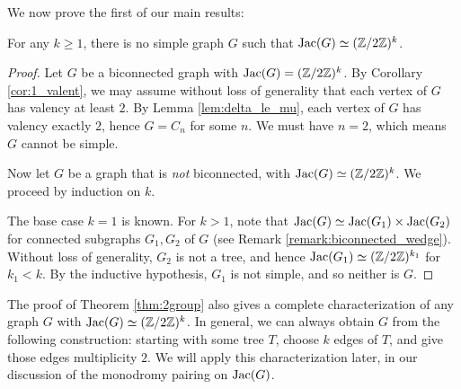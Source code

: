 \documentclass{amsart}
\begin{document}
We now prove the first of our main results:

\begin{thm}
  \label{thm:2group}
  For any $k \ge 1$, there is no simple graph $G$ such that $\operatorname{Jac}(G)
  \simeq (\mathbb{Z}/2\mathbb{Z})^k$.
\end{thm}

\begin{proof}
  Let $G$ be a biconnected graph with $\operatorname{Jac}(G) = (\mathbb{Z}/2\mathbb{Z})^k$. By
  Corollary \ref{cor:1_valent}, we may assume without loss of
  generality that each vertex of $G$ has valency at least $2$. By
  Lemma \ref{lem:delta_le_mu}, each vertex of $G$ has valency exactly
  $2$, hence $G = C_n$ for some $n$. We must have $n=2$, which means
  $G$ cannot be simple.

  Now let $G$ be a graph that is \emph{not} biconnected, with $\operatorname{Jac}(G)
  \simeq (\mathbb{Z}/2\mathbb{Z})^k$. We proceed by induction on $k$.
  
  The base case $k=1$ is known. For $k > 1$, note that $\operatorname{Jac}(G) \simeq
  \operatorname{Jac}(G_1) \times \operatorname{Jac}(G_2)$ for connected subgraphs $G_1, G_2$ of
  $G$ (see Remark \ref{remark:biconnected_wedge}). Without loss of
  generality, $G_2$ is not a tree, and hence $\operatorname{Jac}(G_1) \simeq
  (\mathbb{Z}/2\mathbb{Z})^{k_1}$ for $k_1 < k$. By the inductive hypothesis, $G_1$ is
  not simple, and so neither is $G$.
\end{proof}

\begin{remark}
  The proof of Theorem \ref{thm:2group} also gives a complete
  characterization of any graph $G$ with $\operatorname{Jac}(G) \simeq
  (\mathbb{Z}/2\mathbb{Z})^k$. In general, we can always obtain $G$ from the following
  construction: starting with some tree $T$, choose $k$ edges of $T$,
  and give those edges multiplicity $2$. We will apply this
  characterization later, in our discussion of the monodromy pairing
  on $\operatorname{Jac}(G)$.
\end{remark}
\end{document}

